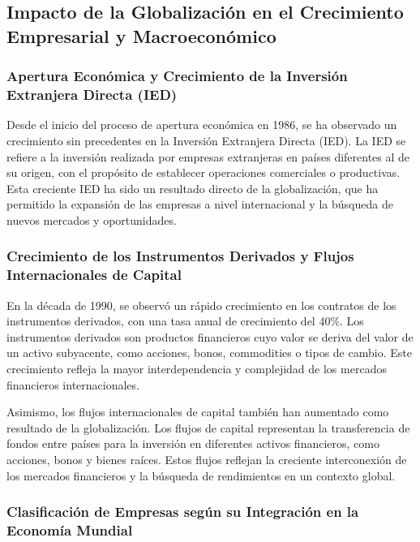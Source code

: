 \documentclass[
  jou,
  floatsintext,
  longtable,
  a4paper,
  nolmodern,
  notxfonts,
  notimes,
  12pt,
  colorlinks=true,linkcolor=blue,citecolor=blue,urlcolor=blue]{apa7}
\begin{document}
\subsection{Impacto de la Globalización en el Crecimiento Empresarial y
Macroeconómico}\label{impacto-de-la-globalizaciuxf3n-en-el-crecimiento-empresarial-y-macroeconuxf3mico}

\subsubsection{Apertura Económica y Crecimiento de la Inversión
Extranjera Directa
(IED)}\label{apertura-econuxf3mica-y-crecimiento-de-la-inversiuxf3n-extranjera-directa-ied}

Desde el inicio del proceso de apertura económica en 1986, se ha
observado un crecimiento sin precedentes en la Inversión Extranjera
Directa (IED). La IED se refiere a la inversión realizada por empresas
extranjeras en países diferentes al de su origen, con el propósito de
establecer operaciones comerciales o productivas. Esta creciente IED ha
sido un resultado directo de la globalización, que ha permitido la
expansión de las empresas a nivel internacional y la búsqueda de nuevos
mercados y oportunidades.

\subsubsection{Crecimiento de los Instrumentos Derivados y Flujos
Internacionales de
Capital}\label{crecimiento-de-los-instrumentos-derivados-y-flujos-internacionales-de-capital}

En la década de 1990, se observó un rápido crecimiento en los contratos
de los instrumentos derivados, con una tasa anual de crecimiento del
40\%. Los instrumentos derivados son productos financieros cuyo valor se
deriva del valor de un activo subyacente, como acciones, bonos,
commodities o tipos de cambio. Este crecimiento refleja la mayor
interdependencia y complejidad de los mercados financieros
internacionales.

Asimismo, los flujos internacionales de capital también han aumentado
como resultado de la globalización. Los flujos de capital representan la
transferencia de fondos entre países para la inversión en diferentes
activos financieros, como acciones, bonos y bienes raíces. Estos flujos
reflejan la creciente interconexión de los mercados financieros y la
búsqueda de rendimientos en un contexto global.

\subsubsection{Clasificación de Empresas según su Integración en la
Economía
Mundial}\label{clasificaciuxf3n-de-empresas-seguxfan-su-integraciuxf3n-en-la-economuxeda-mundial}
\end{document}

